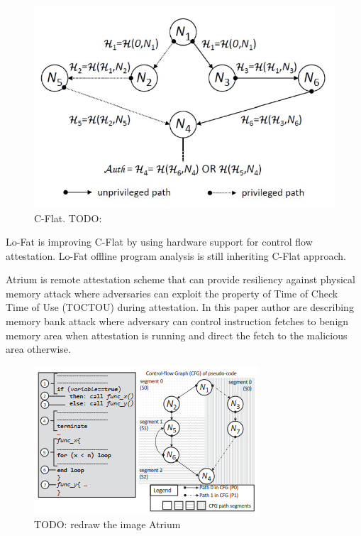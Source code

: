 \begin{figure}[htbp]
\centerline{\includegraphics[scale=.5]{Figures/01/cflat.png}}
\caption{C-Flat. TODO: }
\label{fig:c-flat}
\end{figure}

Lo-Fat\cite{dessoukyLOFATLowOverheadControl2017} is improving C-Flat by using hardware support for control flow attestation. Lo-Fat offline program analysis is still inheriting C-Flat approach.

Atrium \cite{zeitouniATRIUMRuntimeAttestation2017} is remote attestation scheme that can provide resiliency against physical memory attack where adversaries can exploit the property of Time of Check Time of Use (TOCTOU) during attestation. In this paper author are describing memory bank attack where adversary can control instruction fetches to benign memory area when attestation is running and direct the fetch to the malicious area otherwise.

\begin{figure}[htbp]
\centerline{\includegraphics[scale=1]{Figures/01/atrium.png}}
\caption{TODO: redraw the image Atrium}
\label{fig:atrium}
\end{figure}

